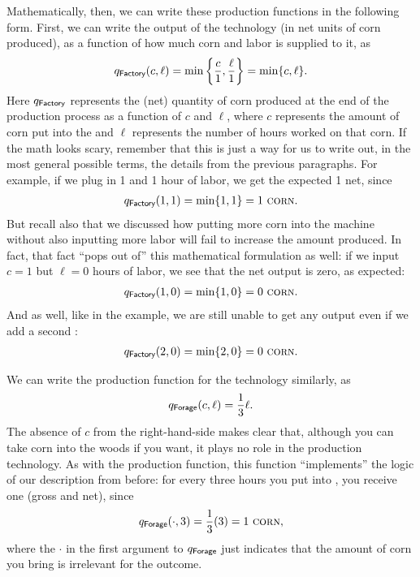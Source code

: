 Mathematically, then, we can write these production functions in the following form. First, we can write the output of the  technology (in net units of corn produced), as a function of how much corn and labor is supplied to it, as
\begin{align*}
	q_{\textsf{Factory}}(c,\ell) = \min{\left\{\frac{c}{1},\frac{\ell}{1}\right\}} = \min\{c,\ell\}.
\end{align*}
Here $q_{\textsf{Factory}}$ represents the (net) quantity of corn produced at the end of the  production process as a function of $c$ and $\ell$, where $c$ represents the amount of corn put into the  and $\ell$ represents the number of hours worked on that corn. If the math looks scary, remember that this is just a way for us to write out, in the most general possible terms, the details from the previous paragraphs. For example, if we plug in 1 \Corn{} and 1 hour of labor, we get the expected 1 \Corn{} net, since
\begin{align*}
	q_{\textsf{Factory}}(1,1) = \min\{1,1\} = 1~\textsc{corn}.
\end{align*}
But recall also that we discussed how putting more corn into the machine without also inputting more labor will fail to increase the amount produced. In fact, that fact ``pops out of'' this mathematical formulation as well: if we input $c = 1$ \Corn{} but $\ell = 0$ hours of labor, we see that the net output is zero, as expected:
\begin{align*}
	q_{\textsf{Factory}}(1,0) = \min\{1,0\} = 0~\textsc{corn}.
\end{align*}
And as well, like in the example, we are still unable to get any output even if we add a second \Corn{}:
\begin{align*}
	q_{\textsf{Factory}}(2,0) = \min\{2,0\} = 0 ~\textsc{corn}.
\end{align*}

We can write the production function for the  technology similarly, as
\begin{align*}
	q_{\textsf{Forage}}(c,\ell) = \frac{1}{3}\ell.
\end{align*}
The absence of $c$ from the right-hand-side makes clear that, although you can take corn into the woods if you want, it plays no role in the  production technology. As with the  production function, this function ``implements'' the logic of our description from before: for every three hours you put into , you receive one \Corn{} (gross and net), since
\begin{align*}
	q_{\textsf{Forage}}(\cdot, 3) = \frac{1}{3}(3) = 1~\textsc{corn},
\end{align*}
where the $\cdot$ in the first argument to $q_{\textsf{Forage}}$ just indicates that the amount of corn you bring is irrelevant for the outcome.

